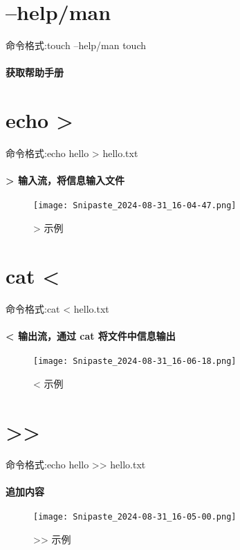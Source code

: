 \documentclass[a4paper, 12pt]{article}
\begin{document}
	\section{--help/man}
	{\color{blue} 命令格式:touch --help/man touch}
	\paragraph{获取帮助手册}
	
	\section{echo >}
	{\color{blue} 命令格式:echo hello > hello.txt}
	\paragraph{> 输入流，将信息输入文件}
    \begin{figure}[h]
        \centering
        \texttt{[image: Snipaste\_2024-08-31\_16-04-47.png]}
        \caption{> 示例}
        \label{fig:>示例}
    \end{figure}
	
	\section{cat <}
	{\color{blue} 命令格式:cat < hello.txt}
    \paragraph{< 输出流，通过 cat 将文件中信息输出}	
    \begin{figure}[h]
        \centering
        \texttt{[image: Snipaste\_2024-08-31\_16-06-18.png]}
        \caption{< 示例}
        \label{fig:<示例}
    \end{figure}

	\section{>>}
	{\color{blue} 命令格式:echo hello >> hello.txt}
	\paragraph{追加内容}
    \begin{figure}[h]
        \centering
        \texttt{[image: Snipaste\_2024-08-31\_16-05-00.png]}
        \caption{>> 示例}
        \label{fig:>>示例}
    \end{figure}
	
\end{document}
